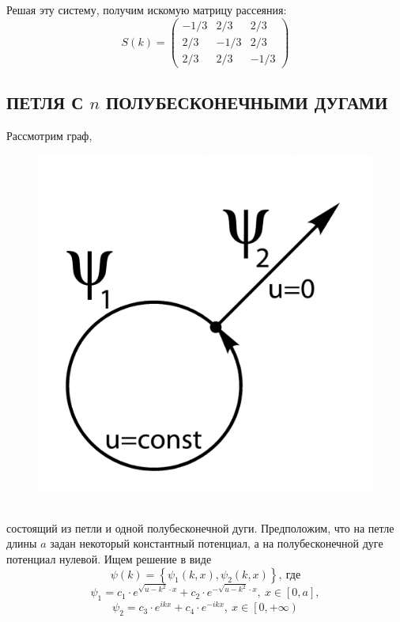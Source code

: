 \documentclass[a4 paper, 12 pt]{extarticle}
\begin{document}
   Решая эту систему, получим искомую матрицу рассеяния:
   \begin{equation}
   \label{starData}
   S(k)=
   \begin{pmatrix}
   -1/3 & 2/3 & 2/3 \\
   2/3 & -1/3 & 2/3 \\
   2/3 & 2/3 & -1/3 
   \end{pmatrix}
   \end{equation}
   \pagebreak
   \subsection{ПЕТЛЯ С $n$ ПОЛУБЕСКОНЕЧНЫМИ ДУГАМИ}
   Рассмотрим граф,
   \begin{figure}[!htb]
   	\centering
   	\includegraphics[scale=0.5]{one-arrow.jpg}
   \end{figure}
   \\состоящий из петли и одной полубесконечной дуги. Предположим, что на петле длины $a$ задан некоторый константный потенциал, а на полубесконечной дуге потенциал нулевой.
   Ищем решение в виде
   \[\psi\left(k\right) = \left\{\psi_1\left(k,x\right), \psi_2\left(k,x\right)\right\}, \ \text{где}\]
   \[
   \psi_1 = c_1\cdot e^{\sqrt{u-k^2} \cdot x} + c_2\cdot e^{-\sqrt{u-k^2} \cdot x}, \ x \in \left[0,a\right],\]
   \[\psi_2 = c_3 \cdot e^{ikx}+c_4 \cdot e^{-ikx}, \ x \in \left[0,+\infty\right)\]
   
\end{document}
